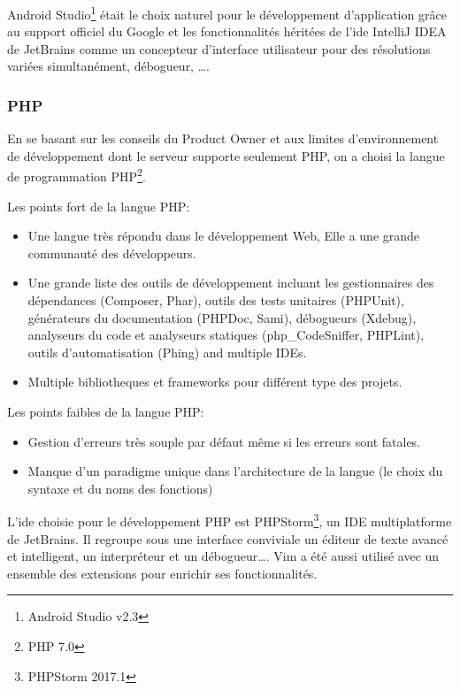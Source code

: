 Android Studio\footnote{Android Studio v2.3} était le choix naturel pour le
développement d'application grâce au support officiel du Google et les
fonctionnalités héritées de l'ide IntelliJ IDEA de JetBrains comme un
concepteur d'interface utilisateur pour des résolutions variées simultanément,
débogueur, \ldots.

\subsubsection{PHP}
En se basant sur les conseils du Product Owner et aux limites d'environnement
de développement dont le serveur supporte seulement PHP, on a choisi la langue
de programmation PHP\footnote{PHP 7.0}.

Les points fort de la langue PHP:

\begin{itemize}
    \item Une langue très répondu dans le développement Web, Elle a une
        grande communauté des développeurs.
    \item Une grande liste des outils de développement incluant les
        gestionnaires des dépendances (Composer, Phar), outils des tests
        unitaires (PHPUnit), générateurs du documentation (PHPDoc, Sami),
        débogueurs (Xdebug), analyseurs du code et analyseurs statiques
        (php\_CodeSniffer, PHPLint), outils d'automatisation (Phing) and
        multiple IDEs.
    \item Multiple bibliotheques et frameworks pour différent type des projets.
\end{itemize}

Les points faibles de la langue PHP:

\begin{itemize}
    \item Gestion d'erreurs très souple par défaut même si les erreurs sont
        fatales.
    \item Manque d'un paradigme unique dans l'architecture de la langue (le
        choix du syntaxe et du noms des fonctions)
\end{itemize}

L'ide choisie pour le développement PHP est PHPStorm\footnote{PHPStorm 2017.1},
un IDE multiplatforme de JetBrains. Il regroupe sous une interface conviviale
un éditeur de texte avancé et intelligent, un interpréteur et un
débogueur\ldots. Vim a été aussi utilisé avec un ensemble des extensions pour
enrichir ses fonctionnalités.

